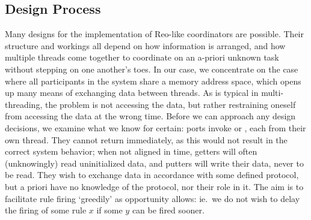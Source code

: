 \subsection{Design Process}
\label{sec:chosen_design}
Many designs for the implementation of Reo-like coordinators are possible. Their structure and workings all depend on how information is arranged, and how multiple threads come together to coordinate on an a-priori unknown task without stepping on one another's toes. In our case, we concentrate on the case where all participants in the system share a memory address space, which opens up many means of exchanging data between threads. As is typical in multi-threading, the problem is not accessing the data, but rather restraining oneself from accessing the data at the wrong time. Before we can approach any design decisions, we examine what we know for certain: ports invoke  or , each from their own thread. They cannot return immediately, as this would not result in the correct system behavior; when not aligned in time, getters will often (unknowingly) read uninitialized data, and putters will write their data, never to be read. They wish to exchange data in accordance with some defined protocol, but a priori have no knowledge of the protocol, nor their role in it. The aim is to facilitate rule firing `greedily' as opportunity allows: ie.\ we do not wish to delay the firing of some rule $x$ if some $y$ can be fired sooner.

